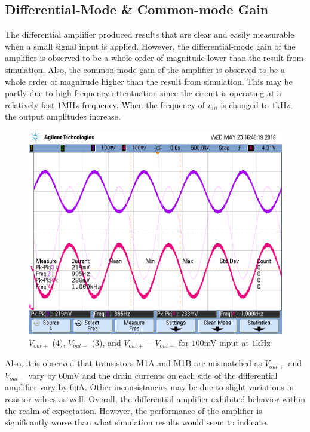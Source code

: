 \subsection{Differential-Mode \& Common-mode Gain}
The differential amplifier produced results that are clear and easily measurable when a small signal input is applied.
However, the differential-mode gain of the amplifier is observed to be a whole order of magnitude lower than the result from simulation.
Also, the common-mode gain of the amplifier is observed to be a whole order of magnirude higher than the result from simulation.
This may be partly due to high frequency attentuation since the circuit is operating at a relatively fast $1$\si{\mega\hertz} frequency. 
When the frequency of $v_{in}$ is changed to $1$\si{\kilo\hertz}, the output amplitudes increase.

\FloatBarrier

\begin{figure}[h!]
	\centering
	\includegraphics[scale=0.4]{./images/scope_2}
	\caption{$V_{out+}$ (4), $V_{out-}$ (3), and $V_{out+} - V_{out-}$ for $100$\si{\milli\volt} input at $1$\si{\kilo\hertz}}
	\label{fig:scope_2}
\end{figure}

\FloatBarrier

Also, it is observed that transistors M1A and M1B are mismatched as $V_{out+}$ and $V_{out-}$ vary by $60$\si{\milli\volt} and the drain currents on each side of the differential amplifier vary by $6$\si{\micro\ampere}.
Other inconsistancies may be due to slight variations in resistor values as well.
Overall, the differential amplifier exhibited behavior within the realm of expectation.
However, the performance of the amplifier is significantly worse than what simulation results would seem to indicate. \\



